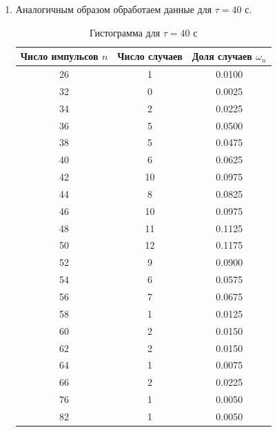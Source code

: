 \documentclass[a4paper, 12pt]{article}
\begin{document}
\begin{enumerate}
		\item Аналогичным образом обработаем данные для $\tau = 40$ с.
		\begin{table}[H]
			\centering
			\caption{Гистограмма для $\tau = 40$ с}
			\begin{tabular}{|c|c|c|}
				\hline
				Число импульсов $n$ & Число случаев & Доля случаев $\omega_n$ \\ \hline
				26                  & 1             & 0.0100                  \\ \hline
				32                  & 0             & 0.0025                  \\ \hline
				34                  & 2             & 0.0225                  \\ \hline
				36                  & 5             & 0.0500                  \\ \hline
				38                  & 5             & 0.0475                  \\ \hline
				40                  & 6             & 0.0625                  \\ \hline
				42                  & 10            & 0.0975                  \\ \hline
				44                  & 8             & 0.0825                  \\ \hline
				46                  & 10            & 0.0975                  \\ \hline
				48                  & 11            & 0.1125                  \\ \hline
				50                  & 12            & 0.1175                  \\ \hline
				52                  & 9             & 0.0900                  \\ \hline
				54                  & 6             & 0.0575                  \\ \hline
				56                  & 7             & 0.0675                  \\ \hline
				58                  & 1             & 0.0125                  \\ \hline
				60                  & 2             & 0.0150                  \\ \hline
				62                  & 2             & 0.0150                  \\ \hline
				64                  & 1             & 0.0075                  \\ \hline
				66                  & 2             & 0.0225                  \\ \hline
				76                  & 1             & 0.0050                  \\ \hline
				82                  & 1             & 0.0050                  \\ \hline
			\end{tabular}
		\end{table}


\end{enumerate}
\end{document}
